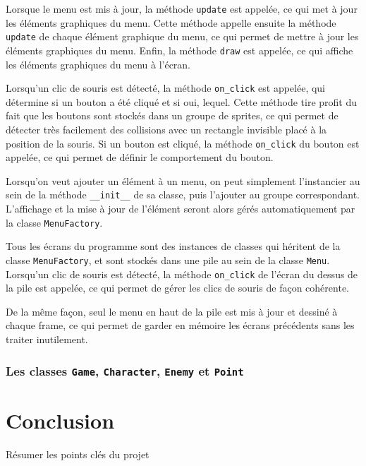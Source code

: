 \documentclass[12pt]{scrreprt} %
\begin{document}
Lorsque le menu est mis à jour, la méthode \texttt{update} est appelée, ce qui met à jour les éléments graphiques du menu. Cette méthode appelle ensuite la méthode \texttt{update} de chaque élément graphique du menu, ce qui permet de mettre à jour les éléments graphiques du menu. Enfin, la méthode \texttt{draw} est appelée, ce qui affiche les éléments graphiques du menu à l'écran.

Lorsqu'un clic de souris est détecté, la méthode \texttt{on\_click} est appelée, qui détermine si un bouton a été cliqué et si oui, lequel. Cette méthode tire profit du fait que les boutons sont stockés dans un groupe de sprites, ce qui permet de détecter très facilement des collisions avec un rectangle invisible placé à la position de la souris. Si un bouton est cliqué, la méthode \texttt{on\_click} du bouton est appelée, ce qui permet de définir le comportement du bouton.

Lorsqu'on veut ajouter un élément à un menu, on peut simplement l'instancier au sein de la méthode \texttt{\_\_init\_\_} de sa classe, puis l'ajouter au groupe correspondant. L'affichage et la mise à jour de l'élément seront alors gérés automatiquement par la classe \texttt{MenuFactory}.

Tous les écrans du programme sont des instances de classes qui héritent de la classe \texttt{MenuFactory}, et sont stockés dans une pile au sein de la classe \texttt{Menu}. Lorsqu'un clic de souris est détecté, la méthode \texttt{on\_click} de l'écran du dessus de la pile est appelée, ce qui permet de gérer les clics de souris de façon cohérente.

De la même façon, seul le menu en haut de la pile est mis à jour et dessiné à chaque frame, ce qui permet de garder en mémoire les écrans précédents sans les traiter inutilement.

\subsection{Les classes \texttt{Game}, \texttt{Character}, \texttt{Enemy} et \texttt{Point}}




\chapter*{Conclusion}

Résumer les points clés du projet
\end{document}
